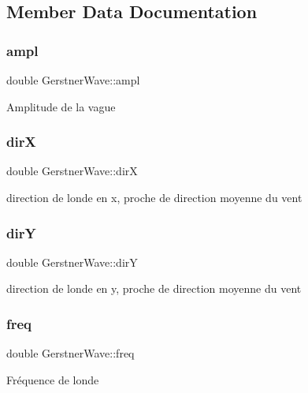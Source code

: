 \subsection{Member Data Documentation}
\hypertarget{class_gerstner_wave_a4f84e62a5c1d6cd89903d678cdfd1142}{}\label{class_gerstner_wave_a4f84e62a5c1d6cd89903d678cdfd1142} 
\subsubsection{\texorpdfstring{ampl}{ampl}}
{\footnotesize\ttfamily double Gerstner\+Wave\+::ampl}

Amplitude de la vague \hypertarget{class_gerstner_wave_a4b245658459be1c4e0ba2408e5ef7434}{}\label{class_gerstner_wave_a4b245658459be1c4e0ba2408e5ef7434} 
\subsubsection{\texorpdfstring{dirX}{dirX}}
{\footnotesize\ttfamily double Gerstner\+Wave\+::dirX}

direction de l\textquotesingle{}onde en x, proche de direction moyenne du vent \hypertarget{class_gerstner_wave_af380f80b44febc264426d11c1457ae17}{}\label{class_gerstner_wave_af380f80b44febc264426d11c1457ae17} 
\subsubsection{\texorpdfstring{dirY}{dirY}}
{\footnotesize\ttfamily double Gerstner\+Wave\+::dirY}

direction de l\textquotesingle{}onde en y, proche de direction moyenne du vent \hypertarget{class_gerstner_wave_a3916382d8e0b58d3f973f75e342859ff}{}\label{class_gerstner_wave_a3916382d8e0b58d3f973f75e342859ff} 
\subsubsection{\texorpdfstring{freq}{freq}}
{\footnotesize\ttfamily double Gerstner\+Wave\+::freq}

Fréquence de l\textquotesingle{}onde \hypertarget{class_gerstner_wave_a713803a3f7f9e5897c6ed39f230914cd}{}\label{class_gerstner_wave_a713803a3f7f9e5897c6ed39f230914cd} 
